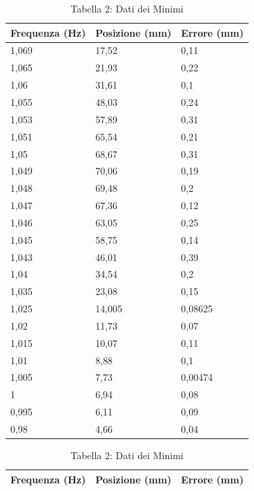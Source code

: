 \documentclass[12pt]{article}
\begin{document}
\begin{table}[ht]
  \begin{minipage}{0.40\textwidth}
    \centering
    \captionsetup{labelformat=empty} %
    \caption{Tabella 1: Dati dei Massimi}
    \begin{tabularx}{\linewidth}{|X|X|X|}
      \hline
      Frequenza (Hz) & Posizione (mm) & Errore (mm) \\
      \hline
      1,069 & 17,52 & 0,11 \\
      1,065 & 21,93 & 0,22 \\
      1,06 & 31,61 & 0,1 \\
      1,055 & 48,03 & 0,24 \\
      1,053 & 57,89 & 0,31 \\
      1,051 & 65,54 & 0,21 \\
      1,05 & 68,67 & 0,31 \\
      1,049 & 70,06 & 0,19 \\
      1,048 & 69,48 & 0,2 \\
      1,047 & 67,36 & 0,12 \\
      1,046 & 63,05 & 0,25 \\
      1,045 & 58,75 & 0,14 \\
      1,043 & 46,01 & 0,39 \\
      1,04 & 34,54 & 0,2 \\
      1,035 & 23,08 & 0,15 \\
      1,025 & 14,005 & 0,08625 \\
      1,02 & 11,73 & 0,07 \\
      1,015 & 10,07 & 0,11 \\
      1,01 & 8,88 & 0,1 \\
      1,005 & 7,73 & 0,00474 \\
      1 & 6,94 & 0,08 \\
      0,995 & 6,11 & 0,09 \\
      0,98 & 4,66 & 0,04 \\
      \hline
    \end{tabularx}
  \end{minipage}
  \hfill
  \begin{minipage}{0.40\textwidth}
    \centering
    \captionsetup{labelformat=empty} %
    \caption{Tabella 2: Dati dei Minimi}
    \begin{tabularx}{\linewidth}{|X|X|X|}
      \hline
      Frequenza (Hz) & Posizione (mm) & Errore (mm) \\
      \hline

\end{tabularx}
\end{minipage}
\end{table}
\end{document}
